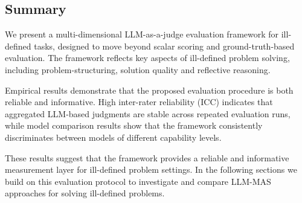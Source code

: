 \subsection{Summary}

We present a multi-dimensional LLM-as-a-judge evaluation framework for ill-defined tasks, designed to move beyond scalar scoring and ground-truth-based evaluation.
The framework reflects key aspects of ill-defined problem solving, including problem-structuring, solution quality and reflective reasoning.

Empirical results demonstrate that the proposed evaluation procedure is both reliable and informative. High inter-rater reliability (ICC) indicates that aggregated LLM-based judgments are stable across repeated evaluation runs, while model comparison results show that the framework consistently discriminates between models of different capability levels.

These results suggest that the framework provides a reliable and informative measurement layer for ill-defined problem settings. In the following sections we build on this evaluation protocol to investigate and compare LLM-MAS approaches for solving ill-defined problems.